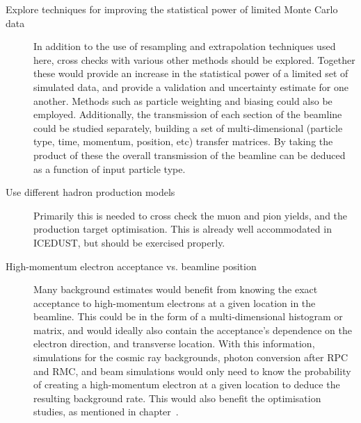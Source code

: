 \begin{description}
	\item[Explore techniques for improving the statistical power of limited Monte Carlo data]
		In addition to the use of resampling and extrapolation techniques used here, cross checks with various other methods should be explored.
		Together these would provide an increase in the statistical power of a limited set of simulated data, and provide a validation and uncertainty estimate for one another.
		Methods such as particle weighting and biasing could also be employed.
		Additionally, the transmission of each section of the beamline could be studied separately, building a set of multi-dimensional (particle type, time, momentum, position, etc) transfer matrices.
		By taking the product of these the overall transmission of the beamline can be deduced as a function of input particle type.
	\item[Use different hadron production models] Primarily this is needed to cross check the muon and pion yields, and the production target optimisation.
		This is already well accommodated in ICEDUST, but should be exercised properly.
	\item[High-momentum electron acceptance vs. beamline position] Many background estimates would benefit from knowing the exact acceptance to high-momentum electrons at a given location in the beamline.
		This could be in the form of a multi-dimensional histogram or matrix, and would ideally also contain the acceptance's dependence on the electron direction, and transverse location.
		With this information, simulations for the cosmic ray backgrounds, photon conversion after RPC and RMC, and beam simulations would only need to know the probability of creating a high-momentum electron at a given location to deduce the resulting background rate.
		This would also benefit the optimisation studies, as mentioned in chapter~.
\end{description}

